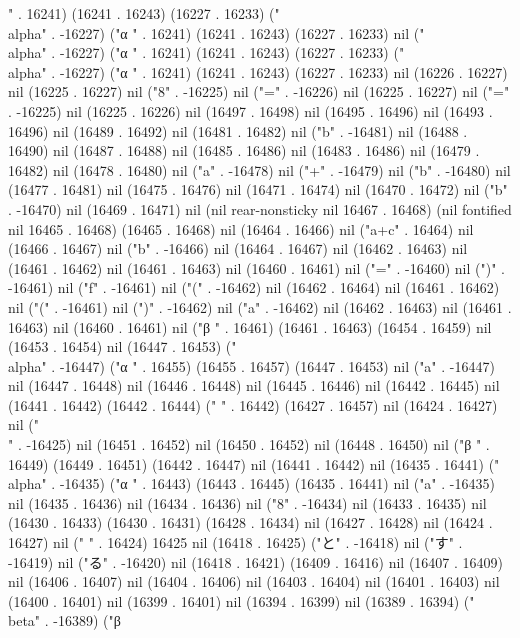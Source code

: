 " . 16241) (16241 . 16243) (16227 . 16233) ("\\alpha" . -16227) ("α
" . 16241) (16241 . 16243) (16227 . 16233) nil ("\\alpha" . -16227) ("α
" . 16241) (16241 . 16243) (16227 . 16233) ("\\alpha" . -16227) ("α
" . 16241) (16241 . 16243) (16227 . 16233) nil (16226 . 16227) nil (16225 . 16227) nil ("8" . -16225) nil ("=" . -16226) nil (16225 . 16227) nil ("=" . -16225) nil (16225 . 16226) nil (16497 . 16498) nil (16495 . 16496) nil (16493 . 16496) nil (16489 . 16492) nil (16481 . 16482) nil ("b" . -16481) nil (16488 . 16490) nil (16487 . 16488) nil (16485 . 16486) nil (16483 . 16486) nil (16479 . 16482) nil (16478 . 16480) nil ("a" . -16478) nil ("+" . -16479) nil ("b" . -16480) nil (16477 . 16481) nil (16475 . 16476) nil (16471 . 16474) nil (16470 . 16472) nil ("b" . -16470) nil (16469 . 16471) nil (nil rear-nonsticky nil 16467 . 16468) (nil fontified nil 16465 . 16468) (16465 . 16468) nil (16464 . 16466) nil ("a+c" . 16464) nil (16466 . 16467) nil ("b" . -16466) nil (16464 . 16467) nil (16462 . 16463) nil (16461 . 16462) nil (16461 . 16463) nil (16460 . 16461) nil ("=" . -16460) nil (")" . -16461) nil ("f" . -16461) nil ("(" . -16462) nil (16462 . 16464) nil (16461 . 16462) nil ("(" . -16461) nil (")" . -16462) nil ("a" . -16462) nil (16462 . 16463) nil (16461 . 16463) nil (16460 . 16461) nil ("β
" . 16461) (16461 . 16463) (16454 . 16459) nil (16453 . 16454) nil (16447 . 16453) ("\\alpha" . -16447) ("α
" . 16455) (16455 . 16457) (16447 . 16453) nil ("a" . -16447) nil (16447 . 16448) nil (16446 . 16448) nil (16445 . 16446) nil (16442 . 16445) nil (16441 . 16442) (16442 . 16444) ("   " . 16442) (16427 . 16457) nil (16424 . 16427) nil ("  \\[
   f(\\alpha+\\beta)=f(a)
  \\]
" . -16425) nil (16451 . 16452) nil (16450 . 16452) nil (16448 . 16450) nil ("β
" . 16449) (16449 . 16451) (16442 . 16447) nil (16441 . 16442) nil (16435 . 16441) ("\\alpha" . -16435) ("α
" . 16443) (16443 . 16445) (16435 . 16441) nil ("a" . -16435) nil (16435 . 16436) nil (16434 . 16436) nil ("8" . -16434) nil (16433 . 16435) nil (16430 . 16433) (16430 . 16431) (16428 . 16434) nil (16427 . 16428) nil (16424 . 16427) nil (" " . 16424) 16425 nil (16418 . 16425) ("と" . -16418) nil ("す" . -16419) nil ("る" . -16420) nil (16418 . 16421) (16409 . 16416) nil (16407 . 16409) nil (16406 . 16407) nil (16404 . 16406) nil (16403 . 16404) nil (16401 . 16403) nil (16400 . 16401) nil (16399 . 16401) nil (16394 . 16399) nil (16389 . 16394) ("\\beta" . -16389) ("β
